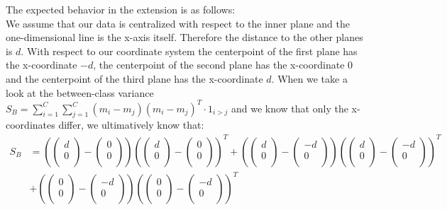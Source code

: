 \documentclass[paper=a4,fontsize=10pt,DIV11,BCOR10mm]{scrartcl}
\begin{document}
The expected behavior in the extension is as follows:\\
We assume that our data is centralized with respect to the inner plane and the one-dimensional line is the x-axis itself. Therefore the distance to the other planes is $d$. With respect to our coordinate system the centerpoint of the first plane has the x-coordinate $-d$, the centerpoint of the second plane has the x-coordinate $0$ and the centerpoint of the third plane has the x-coordinate $d$. When we take a look at the between-class variance \mbox{$S_B = \sum_{i=1}^C\sum_{j=1}^C (m_i - m_j)(m_i - m_j)^T \cdot 1_{i>j}$} and we know that only the x-coordinates differ, we ultimatively know that: \begin{align*}
S_B &= (\begin{pmatrix} d \\0 \\ \end{pmatrix} - \begin{pmatrix} 0 \\ 0 \\ \end{pmatrix})(\begin{pmatrix} d \\0 \\ \end{pmatrix} - \begin{pmatrix} 0 \\ 0 \\ \end{pmatrix})^T 
+(\begin{pmatrix} d \\0 \\ \end{pmatrix} - \begin{pmatrix} -d \\ 0 \\ \end{pmatrix})(\begin{pmatrix} d \\0 \\ \end{pmatrix} - \begin{pmatrix} -d \\ 0 \\ \end{pmatrix})^T  \\ 
& 
+(\begin{pmatrix} 0 \\0 \\ \end{pmatrix} - \begin{pmatrix} -d \\ 0 \\ \end{pmatrix})(\begin{pmatrix} 0 \\0 \\ \end{pmatrix} - \begin{pmatrix} -d \\ 0 \\ \end{pmatrix})^T 

\end{align*}
\end{document}
